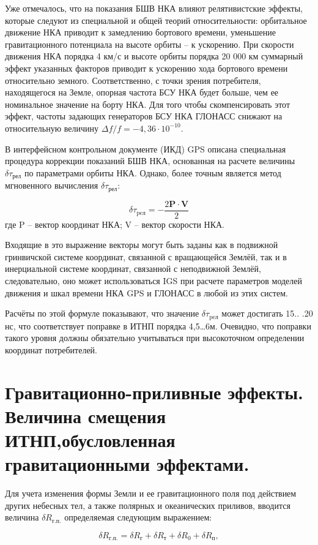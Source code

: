 \documentclass[14pt,a4paper,oneside]{extarticle}
\begin{document}
Уже отмечалось, что на показания БШВ НКА влияют релятивистские эффекты, которые следуют из специальной и общей теорий относительности: орбитальное движение НКА приводит к замедлению бортового времени, уменьшение гравитационного потенциала на высоте орбиты – к ускорению. При скорости движения НКА порядка 4 км/с и высоте орбиты порядка 20 000 км суммарный эффект указанных факторов приводит к ускорению хода бортового времени относительно земного. Соответственно, с точки зрения потребителя, находящегося на Земле, опорная частота БСУ НКА будет больше, чем ее номинальное значение на борту НКА. Для того чтобы скомпенсировать этот эффект, частоты задающих генераторов БСУ НКА ГЛОНАСС снижают на относительную величину $\Delta f/f=-4,36\cdot10^{-10}$.

В интерфейсном контрольном документе (ИКД) GPS описана специальная процедура коррекции показаний БШВ НКА, основанная на расчете величины $\delta \tau_\text{рел}$ по параметрами орбиты НКА. Однако, более точным является метод мгновенного вычисления $\delta \tau_\text{рел}$:

\[\delta\tau_{\text{pe}\text{л}} = - \frac { 2 \boldsymbol{P}\cdot\boldsymbol{V}}{2}\] где P – вектор координат НКА; V – вектор скорости НКА.

Входящие в это выражение векторы могут быть заданы как в подвижной гринвичской системе координат, связанной с вращающейся Землёй, так и в инерциальной системе координат, связанной с неподвижной Землёй, следовательно, оно может использоваться IGS при расчете параметров моделей движения и шкал времени НКА GPS и ГЛОНАСС в любой из этих систем.

Расчёты по этой формуле показывают, что значение $\delta\tau_{\text{pe}\text{л}}$ может достигать 15.. .20 нс, что соответствует поправке в ИТНП порядка 4,5…6м. Очевидно, что поправки такого уровня должны обязательно учитываться при высокоточном определении координат потребителей.

\section{Гравитационно-приливные эффекты. Величина смещения ИТНП,обусловленная гравитационными эффектами.}

Для учета изменения формы Земли и ее гравитационного поля под действием других небесных тел, а также полярных и океанических приливов, вводится величина $\delta R_\text{г.п.}$ определяемая следующим выражением:

\[\delta R_\text{г.п.}=\delta R_\text{г}+\delta R_\text{т}+\delta R_\text{0}+\delta R_\text{п},\]
\end{document}
